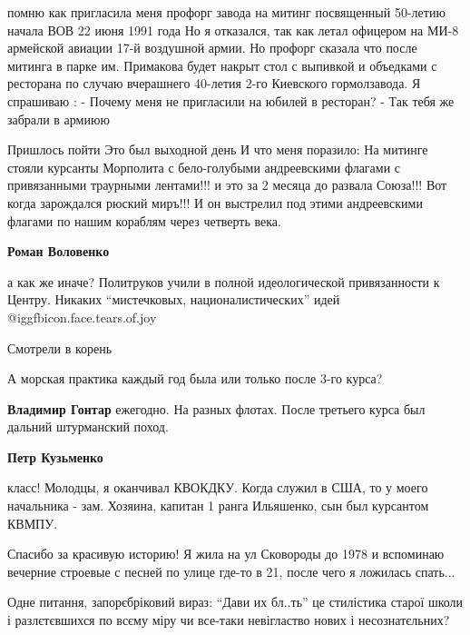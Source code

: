 \begin{itemize}
помню как пригласила меня профорг завода на митинг посвященный 50-летию начала
ВОВ 22 июня 1991 года Но я отказался, так как летал офицером на МИ-8 армейской
авиации 17-й воздушной армии. Но профорг сказала что после митинга в парке им.
Примакова будет накрыт стол с выпивкой и объедками с ресторана по случаю
вчерашнего 40-летия 2-го Киевского гормолзавода. Я спрашиваю : - Почему меня не
пригласили на юбилей в ресторан? - Так тебя же забрали в армиюю


Пришлось пойти Это был выходной день И что меня поразило: На митинге стояли
курсанты Морполита с бело-голубыми андреевскими флагами с привязанными
траурными лентами!!! и это за 2 месяца до развала Союза!!! Вот когда зарождался
рюский миръ!!! И он выстрелил под этими андреевскими флагами по нашим кораблям
через четверть века.

\begin{itemize} %
\textbf{Роман Воловенко} 

а как же иначе? Политруков учили в полной идеологической привязанности к
Центру. Никаких \enquote{мистечковых, националистических} идей  @igg{fbicon.face.tears.of.joy} 

Смотрели в корень
\end{itemize} %

А морская практика каждый год была или только после 3-го курса?

\begin{itemize} %
\textbf{Владимир Гонтар} ежегодно. На разных флотах. После третьего курса был дальний штурманский поход.

\textbf{Петр Кузьменко} 

класс! Молодцы, я оканчивал КВОКДКУ. Когда служил в США, то у моего начальника
- зам. Хозяина, капитан 1 ранга Ильяшенко, сын был курсантом КВМПУ.

\end{itemize} %


Спасибо за красивую историю! Я жила на ул Сковороды до 1978 и вспоминаю
вечерние строевые с песней по улице где-то в 21, после чего я ложилась
спать...


Одне питання, запорєбріковий вираз: \enquote{Дави их бл..ть} це стилістика старої
школи і разлєтєвшихся по всєму міру чи все-таки невігластво нових і
несознатєльних?


\end{itemize}
